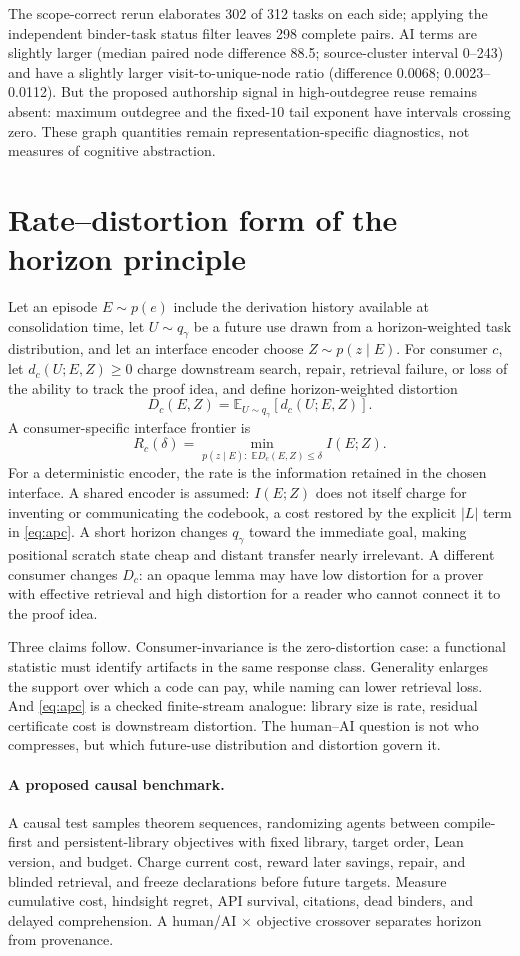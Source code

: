 \documentclass[10pt]{article}
\begin{document}
The scope-correct rerun elaborates 302 of 312 tasks on each side; applying the independent
binder-task status filter leaves 298 complete pairs.  AI terms are slightly larger (median paired node
difference 88.5; source-cluster interval 0--243) and have a slightly larger visit-to-unique-node
ratio (difference 0.0068; 0.0023--0.0112).  But the proposed authorship signal in high-outdegree reuse remains absent:
maximum outdegree and the fixed-$10$ tail exponent have intervals crossing zero.  These graph
quantities remain representation-specific diagnostics, not measures of cognitive abstraction.

\section{Rate--distortion form of the horizon principle}

Let an episode $E\sim p(e)$ include the derivation history available at consolidation time, let
$U\sim q_{\gamma}$ be a future use drawn from a horizon-weighted task distribution, and let an
interface encoder choose $Z\sim p(z\mid E)$.  For consumer $c$, let
$d_c(U;E,Z)\geq0$ charge downstream search, repair, retrieval failure, or loss of the ability to
track the proof idea, and define horizon-weighted distortion
\[
 D_c(E,Z)=\mathbb{E}_{U\sim q_{\gamma}}[d_c(U;E,Z)].
\]
A consumer-specific interface frontier is
\[
 R_c(\delta)=\min_{p(z\mid E):\;\mathbb{E}D_c(E,Z)\leq\delta} I(E;Z).
\]
For a deterministic encoder, the rate is the information retained in the chosen interface.  A
shared encoder is assumed: $I(E;Z)$ does not itself charge for inventing or communicating the
codebook, a cost restored by the explicit $|L|$ term in \cref{eq:apc}.  A
short horizon changes $q_{\gamma}$ toward the immediate goal, making positional scratch state cheap
and distant transfer nearly irrelevant.  A different consumer changes $D_c$: an opaque lemma may
have low distortion for a prover with effective retrieval and high distortion for a reader who
cannot connect it to the proof idea.

Three claims follow.  Consumer-invariance is the zero-distortion case: a functional statistic must
identify artifacts in the same response class.  Generality enlarges the support over which a code
can pay, while naming can lower retrieval loss.  And \cref{eq:apc} is a checked finite-stream
analogue: library size is rate, residual certificate cost is downstream distortion.  The human--AI
question is not who compresses, but which future-use distribution and distortion govern it.

\paragraph{A proposed causal benchmark.}
A causal test samples theorem sequences, randomizing agents between compile-first and persistent-library
objectives with fixed library, target order, Lean version, and budget.  Charge current cost,
reward later savings, repair, and blinded retrieval, and freeze declarations before future targets.
Measure cumulative cost, hindsight regret, API survival, citations, dead binders, and delayed
comprehension.  A human/AI $\times$ objective crossover separates horizon from provenance.
\end{document}
